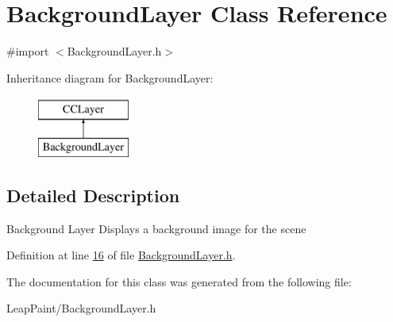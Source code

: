\hypertarget{interface_background_layer}{\section{Background\-Layer Class Reference}
\label{d0/d09/interface_background_layer}
}


{\ttfamily \#import $<$Background\-Layer.\-h$>$}

Inheritance diagram for Background\-Layer\-:\begin{figure}[H]
\begin{center}
\leavevmode
\includegraphics[height=2.000000cm]{d0/d09/interface_background_layer}
\end{center}
\end{figure}


\subsection{Detailed Description}
Background Layer Displays a background image for the scene 

Definition at line \hyperlink{_background_layer_8h_source_l00016}{16} of file \hyperlink{_background_layer_8h_source}{Background\-Layer.\-h}.



The documentation for this class was generated from the following file\-:\begin{DoxyCompactItemize}
\item 
Leap\-Paint/Background\-Layer.\-h\end{DoxyCompactItemize}

